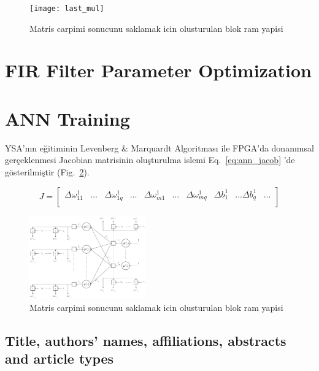 \documentclass[]{interact}
\theoremstyle{plain}%
\theoremstyle{definition}
\theoremstyle{remark}
\begin{document}
\begin{figure}[h]
  \centering
  \texttt{[image: last\_mul]}

  \caption{Matris carpimi sonucunu saklamak icin olusturulan blok ram yapisi}
  \label{fig:last_mul}
\end{figure}



\section{FIR Filter Parameter Optimization}
\section{ANN Training}
YSA’nın eğitiminin Levenberg \& Marquardt Algoritması ile FPGA’da donanımsal gerçeklenmesi Jacobian matrisinin oluşturulma islemi Eq.~\ref{eq:ann_jacob} 'de gösterilmiştir (Fig.~\ref{fig:ann}).

\begin{equation}
\label{eq:ann_jacob}
 J = \begin{bmatrix}
      \Delta\omega^1_{11} & \dots & \Delta\omega^1_{1q} & \dots &
      \Delta\omega^1_{m1} & \dots & \Delta\omega^1_{mq} &
      \Delta b^1_{1} & \dots \Delta b^1_{q} & \dots 
       \\[0.3em]
          
                  
     \end{bmatrix}
\end{equation}


\begin{figure}[h]
  \centering
  \includegraphics[width=5cm]{ann}

  \caption{Matris carpimi sonucunu saklamak icin olusturulan blok ram yapisi}
  \label{fig:ann}
\end{figure}


\subsection{Title, authors' names, affiliations, abstracts and article types}
\end{document}
